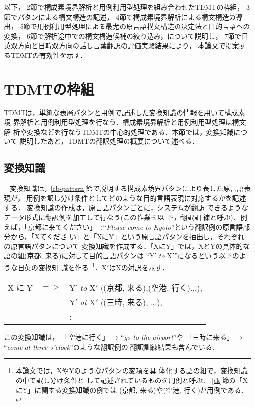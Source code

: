 以下，
2節で構成素境界解析と用例利用型処理を組み合わせたTDMTの枠組，
3節でパタンによる構文構造の記述，
4節で構成素境界解析による構文構造の導出，
5節で用例利用型処理による最尤の原言語構文構造の決定法と目的言語への変換，
6節で解析途中での構文構造候補の絞り込み，について説明し，
7節で日英双方向と日韓双方向の話し言葉翻訳の評価実験結果により，
本論文で提案するTDMTの有効性を示す．

\section{TDMTの枠組}

TDMTは，単純な表層パタンと用例で記述した変換知識の情報を用いて構成素境
界解析と用例利用型処理を行なう．構成素境界解析と用例利用型処理は構文解
析や変換などを行なうTDMTの中心的処理である．本節では，変換知識について
説明したあと，TDMTの翻訳処理の概要について述べる．

\subsection{変換知識}~\label{tk}
変換知識は，\ref{cb-pattern}節で説明する構成素境界パタンにより表した原言語表現が，
用例を訳し分け条件としてどのような目的言語表現に対応するかを記述する．
変換知識の作成は，原言語パタンごとに，システムが翻訳
できるようなデータ形式に翻訳例を加工して行なう(この作業を以
\clearpage
\noindent
下，翻訳訓
練と呼ぶ)．例えば，「京都に来てください」→``{\it Please come to
Kyoto}''という翻訳例の原言語部分から，「Xてくださ
い」と「XにY」という原言語パタンを抽出し，それぞれの原言語パタンについて
変換知識を作成する．「XにY」では，XとYの具体的な
語の組(京都, 来る)に対して目的言語パタンは
``Y$'$ {\it to} X$'$''になるという以下のような日英の変換知
識を作る~\footnote{本論文では，XやYのようなパタンの変項を具
体化する語の組で，変換知識の中で訳し分け条件と
して記述されているものを用例と呼ぶ．
\ref{tk}節の「XにY」に関する変換知識の例では
(京都, 来る)や(空港, 行く)が用例である．
}．X$'$はXの対訳を示す．

\begin{center}
\begin{tabular}{cll}
X に Y &$=>$ & Y$'$ {\it to} X$'$
((京都, 来る),(空港, 行く)...),\\
&& Y$'$ {\it at} X$'$
((三時, 来る), ...),\\
&&\hspace*{5mm} :
\end{tabular}
\end{center}

この変換知識は，
「空港に行く」 → ``{\it go to the airport}''や
「三時に来る」 → ``{\it come at three o'clock}''のような翻訳例の
翻訳訓練結果も含んでいる．


